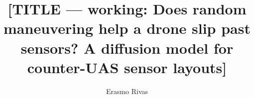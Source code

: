 \documentclass[12pt]{article}
\title{[TITLE --- working: Does random maneuvering help a drone slip past sensors?
A diffusion model for counter-UAS sensor layouts]}
\author{Erasmo Rivas}
\date{}
\begin{document}
\maketitle












\nocite{*}  %



\end{document}
